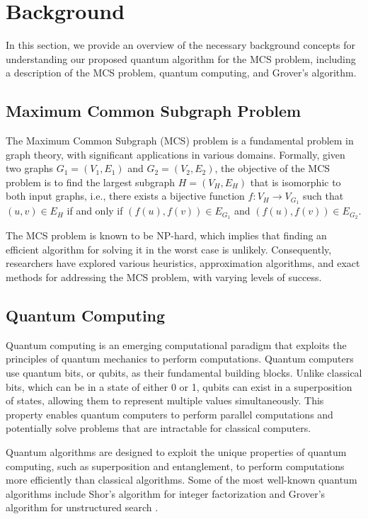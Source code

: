 \section{Background}
\label{sec:background}

In this section, we provide an overview of the necessary background concepts for understanding our proposed quantum algorithm for the MCS problem, including a description of the MCS problem, quantum computing, and Grover's algorithm.

\subsection{Maximum Common Subgraph Problem}

The Maximum Common Subgraph (MCS) problem is a fundamental problem in graph theory, with significant applications in various domains. Formally, given two graphs $G_1=(V_1, E_1)$ and $G_2=(V_2, E_2)$, the objective of the MCS problem is to find the largest subgraph $H=(V_H, E_H)$ that is isomorphic to both input graphs, i.e., there exists a bijective function $f: V_H \rightarrow V_{G_1}$ such that $(u,v) \in E_H$ if and only if $(f(u),f(v)) \in E_{G_1}$ and $(f(u),f(v)) \in E_{G_2}$.

The MCS problem is known to be NP-hard, which implies that finding an efficient algorithm for solving it in the worst case is unlikely. Consequently, researchers have explored various heuristics, approximation algorithms, and exact methods for addressing the MCS problem, with varying levels of success.

\subsection{Quantum Computing}

Quantum computing is an emerging computational paradigm that exploits the principles of quantum mechanics to perform computations. Quantum computers use quantum bits, or qubits, as their fundamental building blocks. Unlike classical bits, which can be in a state of either 0 or 1, qubits can exist in a superposition of states, allowing them to represent multiple values simultaneously. This property enables quantum computers to perform parallel computations and potentially solve problems that are intractable for classical computers.

Quantum algorithms are designed to exploit the unique properties of quantum computing, such as superposition and entanglement, to perform computations more efficiently than classical algorithms. Some of the most well-known quantum algorithms include Shor's algorithm for integer factorization \cite{shor1994algorithms} and Grover's algorithm for unstructured search \cite{grover1996fast}.

